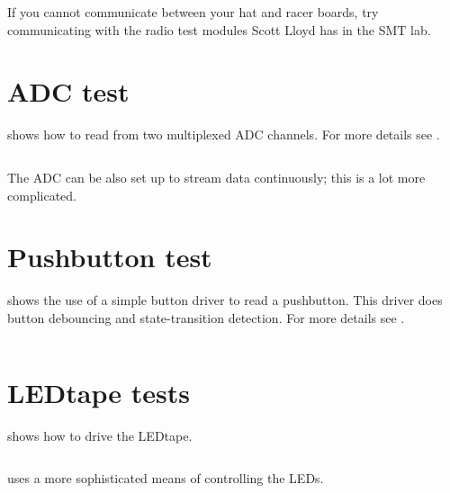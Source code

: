 If you cannot communicate between your hat and racer boards, try
communicating with the radio test modules Scott Lloyd has in the SMT
lab.


\section{ADC test}
\label{ADC}

 shows
how to read from two multiplexed ADC channels.  For more details
see .

\inputminted{C}{../../src/test-apps/adc_usb_serial_test2/adc_usb_serial_test2.c}

The ADC can be also set up to stream data continuously; this is a lot
more complicated.


\section{Pushbutton test}
\label{pushbutton}

 shows the use of a
simple button driver to read a pushbutton.  This driver does button
debouncing and state-transition detection.  For more details see
.

\inputminted{C}{../../src/test-apps/button_test2/button_test2.c}


\section{LEDtape tests}
\label{ledtape}

 shows how to drive the
LEDtape.

\inputminted{C}{../../src/test-apps/ledtape-test1/ledtape-test1.c}


 uses a more
sophisticated means of controlling the LEDs.

\inputminted{C}{../../src/test-apps/ledtape-test2/ledtape-test2.c}

